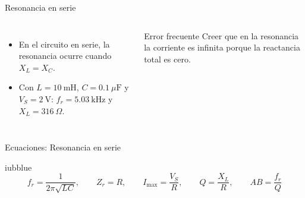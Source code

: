 \documentclass[aspectratio=169,11pt,xcolor={table}]{beamer}
\begin{document}
\begin{frame}{Resonancia en serie}
\begin{columns}[c,onlytextwidth]
\small
\begin{itemize}\setlength{\itemsep}{4pt}
  \item En el circuito en serie, la resonancia ocurre cuando $X_L = X_C$.
  \item Con $L = 10\ \text{mH}$, $C = 0.1\ \mu\text{F}$ y $V_S = 2\ \text{V}$: $f_r = 5.03\ \text{kHz}$ y $X_L = 316\ \Omega$.
\end{itemize}
\begin{cardO}{Error frecuente}
\footnotesize Creer que en la resonancia la corriente es infinita porque la reactancia total es cero.
\end{cardO}
\end{columns}
\end{frame}

\begin{frame}{Ecuaciones: Resonancia en serie}
\begin{cajaplana}{iubblue}
\centering
{\large
\begin{equation*}
  f_r = \frac{1}{2\pi\sqrt{LC}}, \qquad Z_r = R, \qquad I_{\mathrm{max}} = \frac{V_S}{R}, \qquad Q = \frac{X_L}{R}, \qquad AB = \frac{f_r}{Q}
\end{equation*}
}
\end{cajaplana}
\end{frame}
\end{document}
